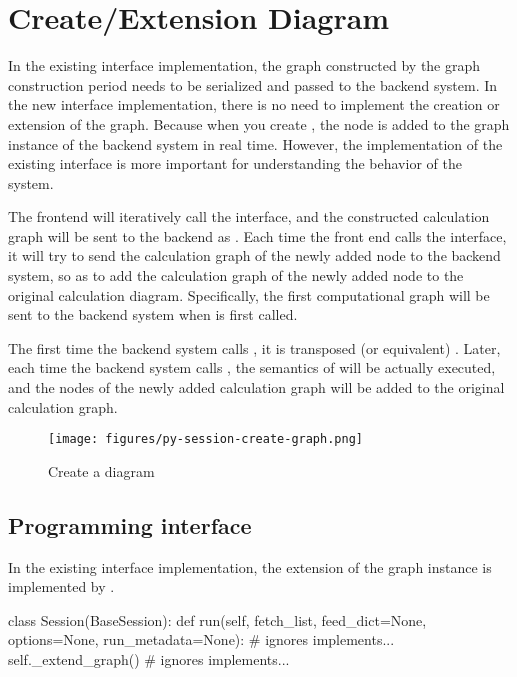 \section{Create/Extension Diagram}
\begin{content}
In the existing interface implementation, the graph constructed by the graph construction period needs to be serialized and passed to the backend  system. In the new interface implementation, there is no need to implement the creation or extension of the graph. Because when you create , the node is added to the graph instance of the backend  system in real time. However, the implementation of the existing interface is more important for understanding the behavior of the system.

The  frontend will iteratively call the  interface, and the constructed calculation graph will be sent to the \cpp{} backend as . Each time the front end calls the  interface, it will try to send the calculation graph of the newly added node to the backend system, so as to add the calculation graph  of the newly added node to the original calculation diagram. Specifically, the first computational graph will be sent to the backend system when  is first called.

The first time the backend system calls , it is transposed (or equivalent) . Later, each time the backend system calls , the semantics of  will be actually executed, and the nodes of the newly added calculation graph will be added to the original calculation graph.

\begin{figure}[H]
  \centering
  \texttt{[image: figures/py-session-create-graph.png]}
  \caption{Create a diagram}
  \label{fig:py-session-create-graph}
\end{figure}


\subsection{Programming interface}
In the existing interface implementation, the extension of the graph instance is implemented by .

\begin{leftbar}
\begin{python}[caption={tensorflow/python/client/session.py}]
class Session(BaseSession):
  def run(self, fetch_list, feed_dict=None, options=None, run_metadata=None):
    # ignores implements...
    self._extend_graph()
    # ignores implements...


\end{python}
\end{leftbar}
\end{content}
